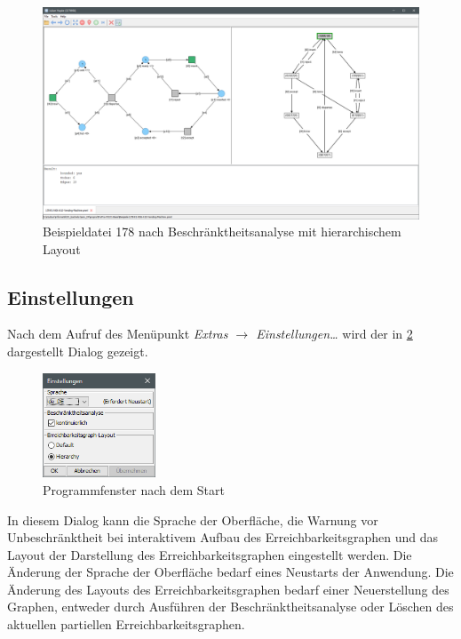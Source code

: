\begin{figure}[ht!]
  \centering
  \includegraphics[width=\textwidth]{../img/Screenshot_178_hierarchy_layout.png}
  \caption{Beispieldatei 178 nach Beschränktheitsanalyse mit hierarchischem Layout}
  \label{img:ex178_hierarchy}
\end{figure}

\subsection{Einstellungen}
\label{sec:settings}
Nach dem Aufruf des Menüpunkt \emph{Extras $\rightarrow$ Einstellungen\ldots}
wird der in \cref{img:settings} dargestellt Dialog gezeigt.

\begin{figure}[H]
  \centering
  \includegraphics[width=0.3\textwidth]{../img/settings.png}
  \caption{Programmfenster nach dem Start}
  \label{img:settings}
\end{figure}

In diesem Dialog kann die Sprache der Oberfläche, die Warnung vor
Unbeschränktheit bei interaktivem Aufbau des Erreichbarkeitsgraphen und das
Layout der Darstellung des Erreichbarkeitsgraphen eingestellt werden. Die
Änderung der Sprache der Oberfläche bedarf eines Neustarts der Anwendung. Die
Änderung des Layouts des Erreichbarkeitsgraphen bedarf einer Neuerstellung des
Graphen, entweder durch Ausführen der Beschränktheitsanalyse oder Löschen des
aktuellen partiellen Erreichbarkeitsgraphen.

